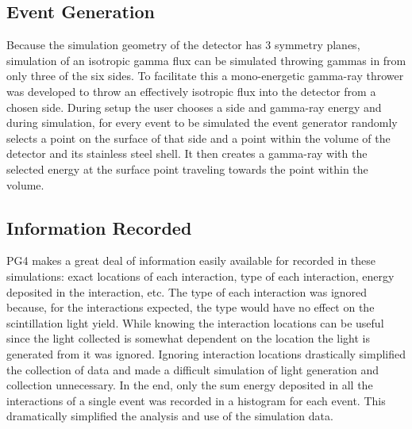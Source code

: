 \documentclass[5p]{elsarticle}
\begin{document}
\subsection{Event Generation}
Because the simulation geometry of the detector has 3 symmetry planes, simulation of an isotropic gamma flux can be simulated throwing gammas in from only three of the six sides. To facilitate this a mono-energetic gamma-ray thrower was developed to throw an effectively isotropic flux into the detector from a chosen side. During setup the user chooses a side and gamma-ray energy and during simulation, for every event to be simulated the event generator randomly selects a point on the surface of that side and a point within the volume of the detector and its stainless steel shell. It then creates a gamma-ray with the selected energy at the surface point traveling towards the point within the volume.

\subsection{Information Recorded}
PG4 makes a great deal of information easily available for recorded in these simulations: exact locations of each interaction, type of each interaction, energy deposited in the interaction, etc. The type of each interaction was ignored because, for the interactions expected, the type would have no effect on the scintillation light yield. While knowing the interaction locations can be useful since the light collected is somewhat dependent on the location the light is generated from it was ignored. Ignoring interaction locations drastically simplified the collection of data and made a difficult simulation of light generation and collection unnecessary. In the end, only the sum energy deposited in all the interactions of a single event was recorded in a histogram for each event. This dramatically simplified the analysis and use of the simulation data.
\end{document}
